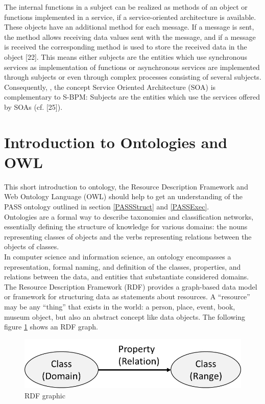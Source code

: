 The internal functions in a subject can be realized as methods of an object or functions implemented in a service, if a service-oriented architecture is available. These objects have an additional method for each message. If a message is sent, the method allows receiving data values sent with the message, and if a message is received the corresponding method is used to store the received data in the object [22]. This means either subjects are the entities which use synchronous services as implementation of functions or asynchronous services are implemented through subjects or even through complex processes consisting of several subjects. Consequently, , the concept Service Oriented Architecture (SOA) is complementary to S-BPM: Subjects are the entities which use the services offered by SOAs (cf. [25]).



\section{Introduction to Ontologies and OWL }
\label{IntroOntology}

This short introduction to ontology, the Resource Description Framework and Web Ontology Language (OWL) should help to get an understanding of the PASS ontology outlined in section \ref{PASSStruct} and \ref{PASSExec}.\\
Ontologies are a formal way to describe taxonomies and classification networks, essentially defining the structure of knowledge for various domains: the nouns representing classes of objects and the verbs representing relations between the objects of classes.\\
In computer science and information science, an ontology encompasses a representation, formal naming, and definition of the classes, properties, and relations between the data, and entities that substantiate considered domains.\\

The Resource Description Framework (RDF) provides a graph-based data model or framework for structuring data as statements about resources. A “resource” may be any “thing” that exists in the world: a person, place, event, book, museum object, but also an abstract concept like data objects.
The following figure \ref{fig:classes-properties}  shows an RDF graph.

\begin{figure}[ph!]
	\centering
	\includegraphics[width=0.7\linewidth]{20181026-Ontologie-Bilder/Grafiken-Ontologie/Introduction/Classes-Properties}
	\caption[RDF graphic]{RDF graphic}
	\label{fig:classes-properties}
\end{figure}

